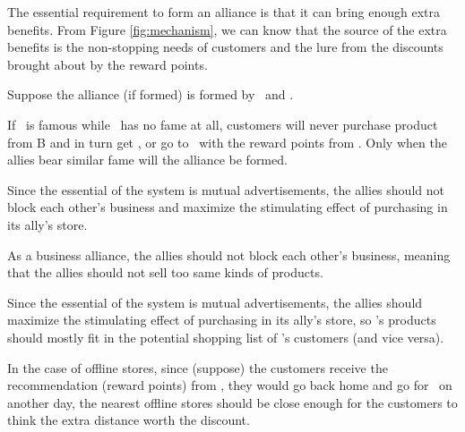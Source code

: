 The essential requirement to form an alliance is that it can bring enough extra benefits. From Figure \ref{fig:mechanism}, we can know that the source of the extra benefits is the non-stopping needs of customers and the lure from the discounts brought about by the reward points.

Suppose the alliance (if formed) is formed by \A\ and \B.

\begin{enumerate}
	
	If \A\ is famous while \B\ has no fame at all, customers will never purchase product from B and in turn get , or go to \B\ with the reward points from . Only when the allies bear similar fame will the alliance be formed.
	
	
	Since the essential of the system is mutual advertisements, the allies should not block each other's business and maximize the stimulating effect of purchasing in its ally's store.
	
	\begin{enumerate}
		
		As a business alliance, the allies should not block each other's business, meaning that the allies should not sell too same kinds of products.
		
		
		Since the essential of the system is mutual advertisements, the allies should maximize the stimulating effect of purchasing in its ally's store, so \A's products should mostly fit in the potential shopping list of \B's customers (and vice versa).
	\end{enumerate}
	
	
	In the case of offline stores, since (suppose) the customers receive the recommendation (reward points) from \A, they would go back home and go for \B\ on another day, the nearest offline stores should be close enough for the customers to think the extra distance worth the discount.
\end{enumerate}


